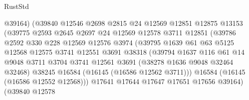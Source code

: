 \begin{lexlean}{RustStd}
\begin{coremodule}
                              @39164)
                            (@39840
                              @12546
                              @2698
                              @2815
                              @24
                              @12569
                              @12851
                              @12875
                              @13153
                              (@39775
                                @2593
                                @2645
                                @2697
                                @24
                                @12569
                                @12578
                                @3711
                                @12851
                                (@39786
                                  @2592
                                  @330
                                  @228
                                  @12569
                                  @12576
                                  @3974
                                  (@39795
                                    @1639
                                    @61
                                    @63
                                    @5125
                                    @12568
                                    @12575
                                    @3741
                                    @12551
                                    @3691
                                    @38318
                                    (@39794
                                      @1637
                                      @116
                                      @61
                                      @14
                                      @9048
                                      @3711
                                      @3704
                                      @3741
                                      @12561
                                      @3691
                                      (@38278 @1636 @9048 @32464 @32468)
                                      @38245
                                      @16584
                                      (@16145 (@16586 @12562 @3711)))
                                    @16584
                                    (@16145 (@16586 @12552 @12568)))
                                  @17641
                                  @17644
                                  @17647
                                  @17651
                                  @17656
                                  @39164)
                                (@39840
                                  @12578

\end{coremodule}
\end{lexlean}
